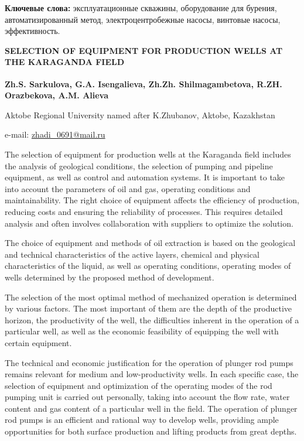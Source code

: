 {\bfseries Ключевые слова:} эксплуатационные скважины, оборудование для
бурения, автоматизированный метод, электроцентробежные насосы, винтовые
насосы, эффективность.

\begin{articleheader}
{\bfseries SELECTION OF EQUIPMENT FOR PRODUCTION WELLS AT THE KARAGANDA FIELD}

{\bfseries
Zh.S. Sarkulova\textsuperscript{\envelope },
G.A. Isengalieva,
Zh.Zh. Shilmagambetova,
R.ZH. Orazbekova,
A.M. Alieva
}
\end{articleheader}

\begin{affiliation}
Aktobe Regional University named after K.Zhubanov, Aktobe, Kazakhstan

e-mail: \href{mailto:zhadi\_0691@mail.ru}{zhadi\_0691@mail.ru}
\end{affiliation}

The selection of equipment for production wells at the Karaganda field
includes the analysis of geological conditions, the selection of pumping
and pipeline equipment, as well as control and automation systems. It is
important to take into account the parameters of oil and gas, operating
conditions and maintainability. The right choice of equipment affects
the efficiency of production, reducing costs and ensuring the
reliability of processes. This requires detailed analysis and often
involves collaboration with suppliers to optimize the solution.

The choice of equipment and methods of oil extraction is based on the
geological and technical characteristics of the active layers, chemical
and physical characteristics of the liquid, as well as operating
conditions, operating modes of wells determined by the proposed method
of development.

The selection of the most optimal method of mechanized operation is
determined by various factors. The most important of them are the depth
of the productive horizon, the productivity of the well, the
difficulties inherent in the operation of a particular well, as well as
the economic feasibility of equipping the well with certain equipment.

The technical and economic justification for the operation of plunger
rod pumps remains relevant for medium and low-productivity wells. In
each specific case, the selection of equipment and optimization of the
operating modes of the rod pumping unit is carried out personally,
taking into account the flow rate, water content and gas content of a
particular well in the field. The operation of plunger rod pumps is an
efficient and rational way to develop wells, providing ample
opportunities for both surface production and lifting products from
great depths.

